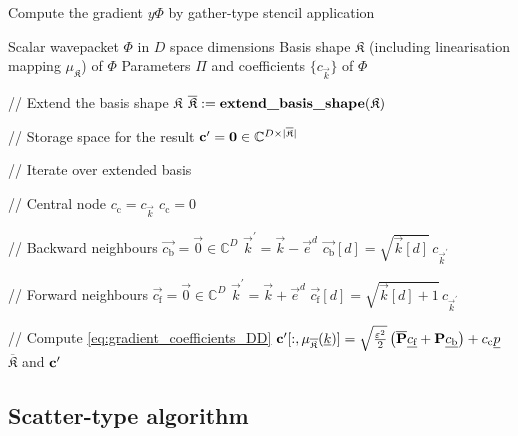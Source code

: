 \begin{algorithm}
\caption{Compute the gradient $y \Phi$ by gather-type stencil application}
\label{al:grad_phi_gather_type}
\begin{algorithmic}
  \REQUIRE Scalar wavepacket $\Phi$ in $D$ space dimensions
  \REQUIRE Basis shape $\mathfrak{K}$ (including linearisation mapping $\mu_{\mathfrak{K}}$) of $\Phi$
  \REQUIRE Parameters $\Pi$ and coefficients $\{c_{\vec{k}}\}$ of $\Phi$

  \STATE // Extend the basis shape $\mathfrak{K}$
  \STATE $\overline{\mathfrak{K}} := \text{\bf{extend\_basis\_shape}}(\mathfrak{K})$

  \STATE // Storage space for the result
  \STATE $\mathbf{c}^\prime = \mathbf{0} \in \mathbb{C}^{D \times |\overline{\mathfrak{K}}|}$

  \STATE // Iterate over extended basis

    \STATE // Central node
      \STATE $c_\text{c} = c_{\vec{k}}$
    \ELSE
      \STATE $c_\text{c} = 0$
    \ENDIF

    \STATE // Backward neighbours
    \STATE $\vec{c_{\text{b}}} = \vec{0} \in \mathbb{C}^{D}$
      \STATE $\vec{k}^\prime = \vec{k} - \vec{e}^d$
        \STATE $\vec{c_\text{b}}[d] = \sqrt{\vec{k}[d]} \, c_{\vec{k}^\prime}$
      \ENDIF
    \ENDFOR

    \STATE // Forward neighbours
    \STATE $\vec{c_{\text{f}}} = \vec{0} \in \mathbb{C}^{D}$
      \STATE $\vec{k}^\prime = \vec{k} + \vec{e}^d$
        \STATE $\vec{c_\text{f}}[d] = \sqrt{\vec{k}[d]+1} \, c_{\vec{k}^\prime}$
      \ENDIF
    \ENDFOR

    \STATE // Compute \eqref{eq:gradient_coefficients_DD}
    \STATE $\mathbf{c}^\prime[:,\mu_{\overline{\mathfrak{K}}}(\underline{k})] = \sqrt{\frac{\varepsilon^2}{2}}
                                             \left( \overline{\mathbf{P}} \underline{c_{\text{f}}} + \mathbf{P} \underline{c_{\text{b}}} \right)
                                             + c_{\text{c}} \underline{p}$
  \ENDFOR
  \RETURN $\overline{\mathfrak{K}}$ and $\mathbf{c}^\prime$
\end{algorithmic}
\end{algorithm}


\subsection{Scatter-type algorithm}


